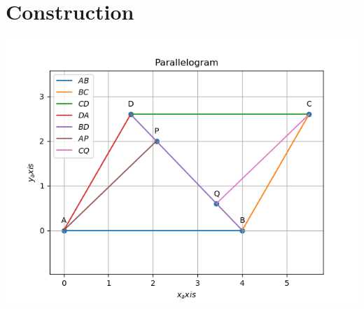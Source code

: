 \documentclass[10pt, a4paper]{article}
\begin{document}
\section{Construction}
\includegraphics[scale=0.66]{matrix_line.png}
 	

\end{document}

